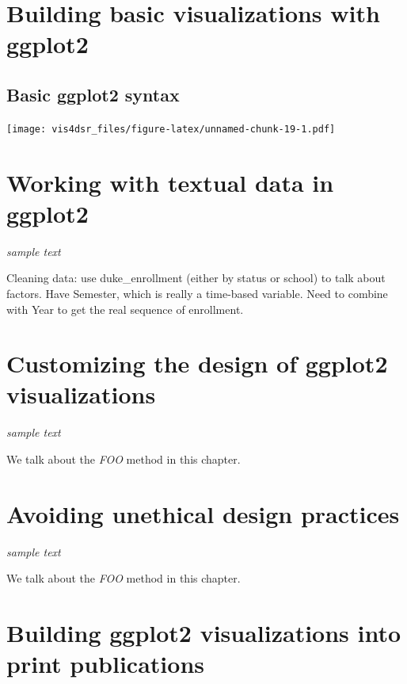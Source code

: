 \documentclass[
]{krantz}
\begin{document}
\hypertarget{building-basic-visualizations}{%
\chapter{Building basic visualizations with ggplot2}\label{building-basic-visualizations}}

\hypertarget{basic-ggplot2-syntax}{%
\section{Basic ggplot2 syntax}\label{basic-ggplot2-syntax}}

\texttt{[image: vis4dsr\_files/figure-latex/unnamed-chunk-19-1.pdf]}

\hypertarget{text-data-visualizations}{%
\chapter{Working with textual data in ggplot2}\label{text-data-visualizations}}

\emph{sample text}

Cleaning data: use duke\_enrollment (either by status or school) to talk about factors.
Have Semester, which is really a time-based variable. Need to combine with Year
to get the real sequence of enrollment.

\hypertarget{customizing-visualization-design}{%
\chapter{Customizing the design of ggplot2 visualizations}\label{customizing-visualization-design}}

\emph{sample text}

We talk about the \emph{FOO} method in this chapter.

\hypertarget{ethical-design-practices}{%
\chapter{Avoiding unethical design practices}\label{ethical-design-practices}}

\emph{sample text}

We talk about the \emph{FOO} method in this chapter.

\hypertarget{print-publications}{%
\chapter{Building ggplot2 visualizations into print publications}\label{print-publications}}
\end{document}
